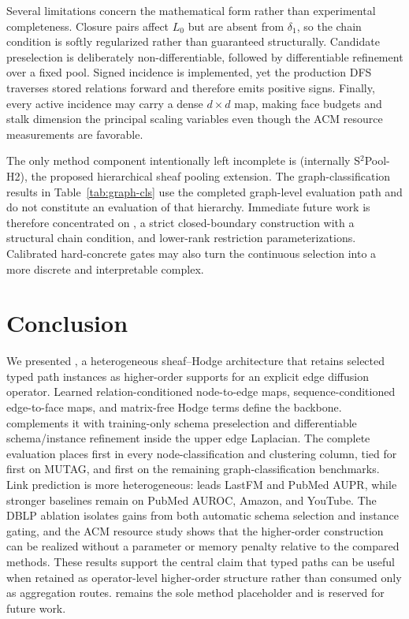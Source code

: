 Several limitations concern the mathematical form rather than experimental completeness. Closure
pairs affect $L_0$ but are absent from $\delta_1$, so the chain condition is softly regularized rather
than guaranteed structurally. Candidate preselection is deliberately non-differentiable, followed
by differentiable refinement over a fixed pool. Signed incidence is implemented, yet the production
DFS traverses stored relations forward and therefore emits positive signs. Finally, every active
incidence may carry a dense $d\times d$ map, making face budgets and stalk dimension the principal
scaling variables even though the ACM resource measurements are favorable.

The only method component intentionally left incomplete is \thspool{} (internally S$^2$Pool-H2),
the proposed hierarchical sheaf pooling extension. The graph-classification results in
Table~\ref{tab:graph-cls} use the completed graph-level evaluation path and do not constitute an
evaluation of that hierarchy. Immediate future work is therefore concentrated on \thspool{}, a
strict closed-boundary construction with a structural chain condition, and lower-rank restriction
parameterizations. Calibrated hard-concrete gates may also turn the continuous \ampss{} selection
into a more discrete and interpretable complex.

\section{Conclusion}

We presented \method, a heterogeneous sheaf--Hodge architecture that retains selected typed path
instances as higher-order supports for an explicit edge diffusion operator. Learned
relation-conditioned node-to-edge maps, sequence-conditioned edge-to-face maps, and matrix-free
Hodge terms define the backbone. \ampss{} complements it with training-only schema preselection
and differentiable schema/instance refinement inside the upper edge Laplacian. The complete
evaluation places \method{} first in every node-classification and clustering column, tied for first
on MUTAG, and first on the remaining graph-classification benchmarks. Link prediction is more
heterogeneous: \method{} leads LastFM and PubMed AUPR, while stronger baselines remain on PubMed
AUROC, Amazon, and YouTube. The DBLP ablation isolates gains from both automatic schema selection
and instance gating, and the ACM resource study shows that the higher-order construction can be
realized without a parameter or memory penalty relative to the compared methods. These results
support the central claim that typed paths can be useful when retained as operator-level
higher-order structure rather than consumed only as aggregation routes. \thspool{} remains the sole
method placeholder and is reserved for future work.

